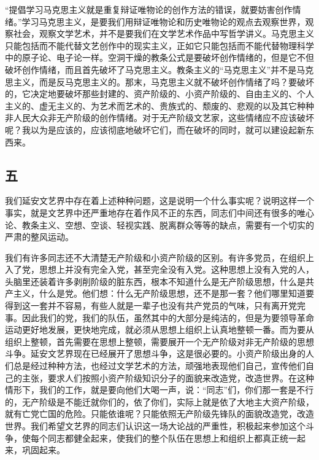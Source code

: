 “提倡学习马克思主义就是重复辩证唯物论的创作方法的错误，就要妨害创作情绪。”学习马克思主义，是要我们用辩证唯物论和历史唯物论的观点去观察世界，观察社会，观察文学艺术，并不是要我们在文学艺术作品中写哲学讲义。马克思主义只能包括而不能代替文艺创作中的现实主义，正如它只能包括而不能代替物理科学中的原子论、电子论一样。空洞干燥的教条公式是要破坏创作情绪的，但是它不但破坏创作情绪，而且首先破坏了马克思主义。教条主义的“马克思主义”并不是马克思主义，而是反马克思主义的。那末，马克思主义就不破坏创作情绪了吗？要破坏的，它决定地要破坏那些封建的、资产阶级的、小资产阶级的、自由主义的、个人主义的、虚无主义的、为艺术而艺术的、贵族式的、颓废的、悲观的以及其它种种非人民大众非无产阶级的创作情绪。对于无产阶级文艺家，这些情绪应不应该破坏呢？我以为是应该的，应该彻底地破坏它们，而在破坏的同时，就可以建设起新东西来。

\subsection*{五}

我们延安文艺界中存在着上述种种问题，这是说明一个什么事实呢？说明这样一个事实，就是文艺界中还严重地存在着作风不正的东西，同志们中间还有很多的唯心论、教条主义、空想、空谈、轻视实践、脱离群众等等的缺点，需要有一个切实的严肃的整风运动。

我们有许多同志还不大清楚无产阶级和小资产阶级的区别。有许多党员，在组织上入了党，思想上并没有完全入党，甚至完全没有入党。这种思想上没有入党的人，头脑里还装着许多剥削阶级的脏东西，根本不知道什么是无产阶级思想，什么是共产主义，什么是党。他们想：什么无产阶级思想，还不是那一套？他们哪里知道要得到这一套并不容易，有些人就是一辈子也没有共产党员的气味，只有离开党完事。因此我们的党，我们的队伍，虽然其中的大部分是纯洁的，但是为要领导革命运动更好地发展，更快地完成，就必须从思想上组织上认真地整顿一番。而为要从组织上整顿，首先需要在思想上整顿，需要展开一个无产阶级对非无产阶级的思想斗争。延安文艺界现在已经展开了思想斗争，这是很必要的。小资产阶级出身的人们总是经过种种方法，也经过文学艺术的方法，顽强地表现他们自己，宣传他们自己的主张，要求人们按照小资产阶级知识分子的面貌来改造党，改造世界。在这种情形下，我们的工作，就是要向他们大喝一声，说：“同志”们，你们那一套是不行的，无产阶级是不能迁就你们的，依了你们，实际上就是依了大地主大资产阶级，就有亡党亡国的危险。只能依谁呢？只能依照无产阶级先锋队的面貌改造党，改造世界。我们希望文艺界的同志们认识这一场大论战的严重性，积极起来参加这个斗争，使每个同志都健全起来，使我们的整个队伍在思想上和组织上都真正统一起来，巩固起来。

